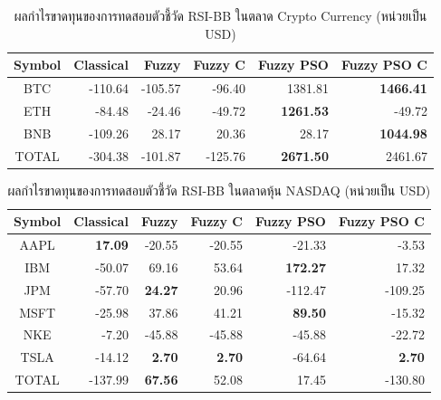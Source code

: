 \begin{table}[!ht]
    \centering
    \begin{tabular}{crrrrr}
        \hline
        \textbf{Symbol} & \textbf{Classical} & \textbf{Fuzzy} & \textbf{Fuzzy C} & \textbf{Fuzzy PSO} & \textbf{Fuzzy PSO C} \\ \hline
        BTC             & -110.64            & -105.57        & -96.40           & 1381.81            & \textbf{1466.41}     \\ \hline
        ETH             & -84.48             & -24.46         & -49.72           & \textbf{1261.53}   & -49.72               \\ \hline
        BNB             & -109.26            & 28.17          & 20.36            & 28.17              & \textbf{1044.98}     \\ \hline
        TOTAL           & -304.38            & -101.87        & -125.76          & \textbf{2671.50}   & 2461.67              \\ \hline
    \end{tabular}
    \caption{ผลกำไรขาดทุนของการทดสอบตัวชี้วัด RSI-BB ในตลาด Crypto Currency (หน่วยเป็น USD)}
    \label{tab:rsi-bb-crypto}
\end{table}

\begin{table}[!ht]
    \centering
    \begin{tabular}{crrrrr}
        \hline
        \textbf{Symbol} & \textbf{Classical} & \textbf{Fuzzy} & \textbf{Fuzzy C} & \textbf{Fuzzy PSO} & \textbf{Fuzzy PSO C} \\ \hline
        AAPL            & \textbf{17.09}     & -20.55         & -20.55           & -21.33             & -3.53                \\ \hline
        IBM             & -50.07             & 69.16          & 53.64            & \textbf{172.27}    & 17.32                \\ \hline
        JPM             & -57.70             & \textbf{24.27} & 20.96            & -112.47            & -109.25              \\ \hline
        MSFT            & -25.98             & 37.86          & 41.21            & \textbf{89.50}     & -15.32               \\ \hline
        NKE             & -7.20              & -45.88         & -45.88           & -45.88             & -22.72               \\ \hline
        TSLA            & -14.12             & \textbf{2.70}  & \textbf{2.70}    & -64.64             &
        \textbf{2.70}                                                                                                        \\ \hline
        TOTAL           & -137.99            & \textbf{67.56} & 52.08            & 17.45              & -130.80              \\ \hline
    \end{tabular}
    \caption{ผลกำไรขาดทุนของการทดสอบตัวชี้วัด RSI-BB ในตลาดหุ้น NASDAQ (หน่วยเป็น USD)}
    \label{tab:rsi-bb-stocks}
\end{table}

